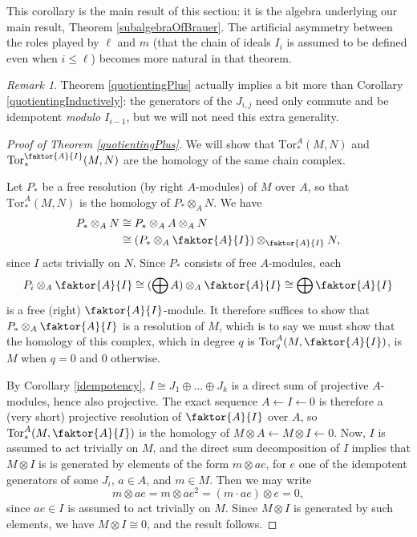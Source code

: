 \documentclass[12pt]{amsart}
\theoremstyle{plain}
\theoremstyle{definition} \newtheorem{definition}[theorem]{Definition}
\theoremstyle{plain}
\theoremstyle{plain} \newtheorem{proposition}[theorem]{Proposition}
\theoremstyle{plain} \newtheorem{conjecture}[theorem]{Conjecture}
\theoremstyle{plain} \newtheorem{corollary}[theorem]{Corollary}
\theoremstyle{remark} \newtheorem{claim}[theorem]{Claim}
\theoremstyle{remark} \newtheorem{remark}[theorem]{Remark}
\theoremstyle{remark} \newtheorem{example}[theorem]{Example}
\theoremstyle{remark} \newtheorem{comment}[theorem]{Comment}
\theoremstyle{definition} \newtheorem{question}[theorem]{Question}
\newcommand{\Tor}{\mathrm{Tor}}
\begin{document}
This corollary is the main result of this section: it is the algebra underlying our main result, Theorem \ref{subalgebraOfBrauer}. The artificial asymmetry between the roles played by $\ell$ and $m$ (that the chain of ideals $I_i$ is assumed to be defined even when $i \leq \ell$) becomes more natural in that theorem.

\begin{remark} Theorem \ref{quotientingPlus} actually implies a bit more than Corollary \ref{quotientingInductively}: the generators of the $J_{i,j}$ need only commute and be idempotent \emph{modulo $I_{i-1}$}, but we will not need this extra generality. \end{remark}

\begin{proof}[Proof of Theorem \ref{quotientingPlus}] We will show that $\Tor^A_*(M,N)$ and $\Tor^{\faktor{A}{I}}_*(M,N)$ are the homology of the same chain complex.

Let $P_*$ be a free resolution (by right $A$-modules) of $M$ over $A$, so that $\Tor^A_*(M,N)$ is the homology of $P_* \otimes_A N$. We have
\begin{align*}
    P_* \otimes_A N & \cong P_* \otimes_A A \otimes_A N \\
    & \cong (P_* \otimes_A \faktor{A}{I}) \otimes_{\faktor{A}{I}} N,
\end{align*} since $I$ acts trivially on $N$. Since $P_*$ consists of free $A$-modules, each $$P_i \otimes_A \faktor{A}{I} \cong (\bigoplus A) \otimes_A \faktor{A}{I} \cong \bigoplus \faktor{A}{I}$$ is a free (right) $\faktor{A}{I}$-module. It therefore suffices to show that $P_* \otimes_A \faktor{A}{I}$ is a resolution of $M$, which is to say we must show that the homology of this complex, which in degree $q$ is $\Tor_q^A(M,\faktor{A}{I})$, is $M$ when $q=0$ and $0$ otherwise.

By Corollary \ref{idempotency}, $I \cong J_1 \oplus \dots \oplus J_k$ is a direct sum of projective $A$-modules, hence also projective. The exact sequence $A \xleftarrow{} I \xleftarrow{} 0$ is therefore a (very short) projective resolution of $\faktor{A}{I}$ over $A$, so $\Tor_*^A(M,\faktor{A}{I})$ is the homology of $M \otimes A \xleftarrow{} M \otimes I \xleftarrow{} 0$. Now, $I$ is assumed to act trivially on $M$, and the direct sum decomposition of $I$ implies that $M \otimes I$ is is generated by elements of the form $m \otimes a e$, for $e$ one of the idempotent generators of some $J_i$, $a \in A$, and $m \in M$. Then we may write $$m \otimes a e = m \otimes a e^2 = (m \cdot ae ) \otimes e = 0,$$ since $ae \in I$ is assumed to act trivially on $M$. Since $M \otimes I$ is generated by such elements, we have $M \otimes I \cong 0$, and the result follows. \end{proof}
\end{document}
